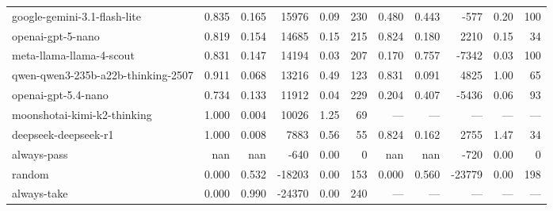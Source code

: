 \begin{table}[t]
{\begin{tabular}{lrrrrr|rrrrr}
google-gemini-3.1-flash-lite & 0.835 & 0.165 & 15976 & 0.09 & 230 & 0.480 & 0.443 & -577 & 0.20 & 100 \\
openai-gpt-5-nano & 0.819 & 0.154 & 14685 & 0.15 & 215 & 0.824 & 0.180 & 2210 & 0.15 & 34 \\
meta-llama-llama-4-scout & 0.831 & 0.147 & 14194 & 0.03 & 207 & 0.170 & 0.757 & -7342 & 0.03 & 100 \\
qwen-qwen3-235b-a22b-thinking-2507 & 0.911 & 0.068 & 13216 & 0.49 & 123 & 0.831 & 0.091 & 4825 & 1.00 & 65 \\
openai-gpt-5.4-nano & 0.734 & 0.133 & 11912 & 0.04 & 229 & 0.204 & 0.407 & -5436 & 0.06 & 93 \\
moonshotai-kimi-k2-thinking & 1.000 & 0.004 & 10026 & 1.25 & 69 & --- & --- & --- & --- & --- \\
deepseek-deepseek-r1 & 1.000 & 0.008 & 7883 & 0.56 & 55 & 0.824 & 0.162 & 2755 & 1.47 & 34 \\
always-pass & nan & nan & -640 & 0.00 & 0 & nan & nan & -720 & 0.00 & 0 \\
random & 0.000 & 0.532 & -18203 & 0.00 & 153 & 0.000 & 0.560 & -23779 & 0.00 & 198 \\
always-take & 0.000 & 0.990 & -24370 & 0.00 & 240 & --- & --- & --- & --- & --- \\
\bottomrule
\end{tabular}
}
\end{table}